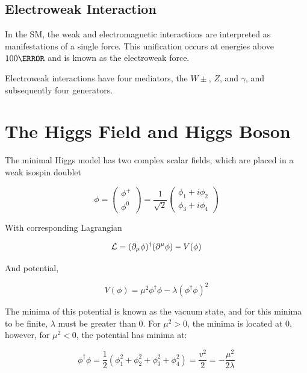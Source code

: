         \subsection{Electroweak Interaction}

        In the \gls{SM}, the weak and electromagnetic interactions are interpreted as manifestations of a single force. This unification occurs at energies above $\unit{100}{\GeV}$ and is known as the electroweak force.

        Electroweak interactions have four mediators, the $W\pm$, $Z$, and $\gamma$, and subsequently four generators. 


\section{The Higgs Field and Higgs Boson}

The minimal Higgs model has two complex scalar fields, which are placed in a weak isospin doublet

\begin{equation}
\phi = \begin{pmatrix} \phi^+ \\ \phi^0 \end{pmatrix}
    = \frac{1}{\sqrt{2}}\begin{pmatrix}
        \phi_1 + i\phi_2 \\ \phi_3 + i\phi_4
    \end{pmatrix}
\end{equation}

With corresponding Lagrangian

\begin{equation} \label{higgs-lagrangian}
    \mathcal{L} = (\partial_{\mu}\phi)^\dagger (\partial^{\mu}\phi) - V(\phi)\\
\end{equation}

And potential,

\begin{equation} \label{higgs-potential}
    V(\phi) = \mu^2\phi^\dagger \phi - \lambda(\phi^\dagger \phi)^2
\end{equation}

The minima of this potential is known as the vacuum state, and for this minima to be finite, $\lambda$ must be greater than 0. For $\mu^2 >0$, the minima is located at 0, however, for $\mu^2<0$, the potential has minima at:

\begin{equation}
    \phi^\dagger \phi = \frac{1}{2}(\phi_{1}^{2}+\phi_{2}^{2}+\phi_{3}^{2}+\phi_{4}^{2}) = \frac{v^2}{2} = -\frac{\mu^2}{2\lambda}
\end{equation}

